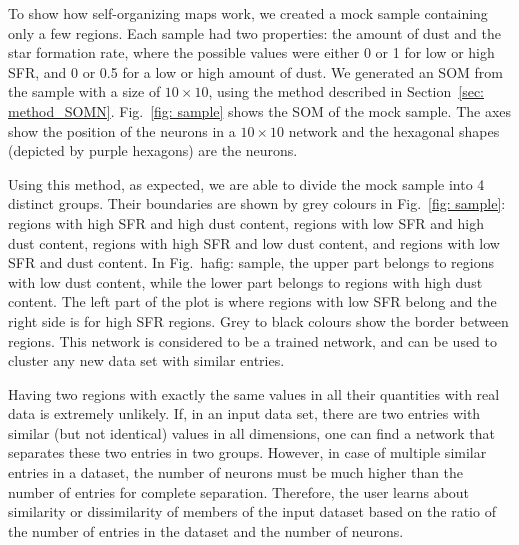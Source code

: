 To show how self-organizing maps work, we created a mock sample containing only a few regions.
Each sample had two properties: the amount of dust and the star formation rate, where the possible values were
either 0 or 1 for low or high SFR, and 0 or 0.5 for a low or high amount of dust. 
 We generated an SOM from the sample with a size of $10 \times 10$, using the method described in Section~\ref{sec: method_SOMN}.
 Fig.~\ref{fig: sample} shows the SOM of the mock sample. 
 The axes show the position of the neurons in a $10 \times 10$ network and the hexagonal shapes (depicted by purple hexagons) are the neurons.
 
Using this method, as expected, we are able to divide the mock sample into 4 distinct groups. Their boundaries are shown by grey colours in Fig.~\ref{fig: sample}: regions with high SFR and high dust content, regions with low SFR and high dust content, regions with high SFR and low dust content, and regions with low SFR and dust content. 
In Fig.~ ha{fig: sample}, the upper part belongs to regions with low dust content, while the lower part belongs to regions with high dust content.
The left part of the plot is where regions with low SFR belong and the right side is for high SFR regions.
Grey to black colours show the border between regions.
This network is considered to be a trained network, and can be used to cluster any new data set with similar entries.

Having two regions with exactly the same values in all their quantities with real data is extremely unlikely. 
If, in an input data set, there are two entries with similar (but not identical) values in all dimensions, one can find a network that separates these two entries in two groups.  
However, in case of multiple similar entries in a dataset, the number of neurons must be much higher than the number of entries for complete separation.
Therefore, the user learns about similarity or dissimilarity of members of the input dataset based on the ratio of the number of entries in the dataset and  the number of neurons. 

